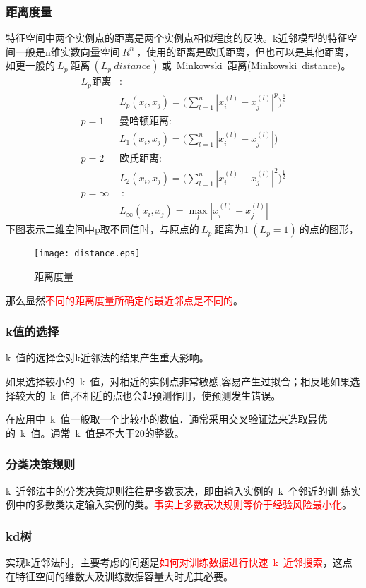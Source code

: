 \subsubsection{距离度量}
特征空间中两个实例点的距离是两个实例点相似程度的反映。k近邻模型的特征空间一般是n维实数向量空间$~R^n~$，使用的距离是欧氏距离，但也可以是其他距离， 如更一般的$~L_p~$距离$~(L_p~distance)~$或~Minkowski~距离(Minkowski~distance)。
\begin{align}
    L_p\text{距离}&: \nonumber\\
    &L_p(x_i,x_j)=\Big(\sum_{l=1}^{n}|x_i^{(l)}-x_j^{(l)}|^p\Big)^{\frac{1}{p}} \nonumber \\
    p=1~~~&\text{曼哈顿距离}:\nonumber \\
    &L_1(x_i,x_j)=\Big(\sum_{l=1}^{n}|x_i^{(l)}-x_j^{(l)}|\Big) \nonumber \\
    p=2~~~&\text{欧氏距离}:\nonumber\\
    &L_2(x_i,x_j)=\Big(\sum_{l=1}^{n}|x_i^{(l)}-x_j^{(l)}|^2\Big)^{\frac{1}{2}} \nonumber \\
    p=\infty~&~:\nonumber\\
    &L_\infty(x_i,x_j)=\max\limits_l |x_i^{(l)}-x_j^{(l)}| \nonumber 
\end{align}
下图表示二维空间中p取不同值时，与原点的$~L_p~$距离为1$~(L_p=1)~$的点的图形，
\begin{figure}
  \centering
  \texttt{[image: distance.eps]}
  \caption{距离度量}
\end{figure}
那么显然\textcolor{red}{不同的距离度量所确定的最近邻点是不同的}。

\subsubsection{k值的选择}
k~值的选择会对k近邻法的结果产生重大影响。

如果选择较小的~k~值，对相近的实例点非常敏感,容易产生过拟合；相反地如果选择较大的~k~值,不相近的点也会起预测作用，使预测发生错误。

在应用中~k~值一般取一个比较小的数值．通常采用交叉验证法来选取最优的~k~值。通常~k~值是不大于20的整数。
\subsubsection{分类决策规则}
k~近邻法中的分类决策规则往往是多数表决，即由输入实例的~k~个邻近的训 练实例中的多数类决定输入实例的类。\textcolor{red}{事实上多数表决规则等价于经验风险最小化}。

\subsubsection{kd树}
实现k近邻法时，主要考虑的问题是\textcolor{red}{如何对训练数掘进行快速~k~近邻搜索}，这点在特征空间的维数大及训练数据容量大时尤其必要。

